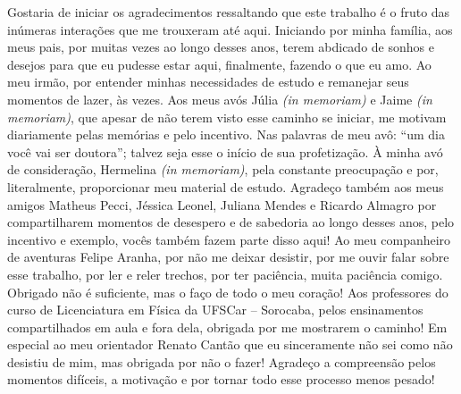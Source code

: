 

\begin{agradecimentos}
  Gostaria de iniciar os agradecimentos ressaltando que este trabalho é o fruto das inúmeras interações que me trouxeram até aqui. Iniciando por minha família, aos meus pais, por muitas vezes ao longo desses anos, terem abdicado de sonhos e desejos para que eu pudesse estar aqui, finalmente, fazendo o que eu amo. Ao meu irmão, por entender minhas necessidades de estudo e remanejar seus momentos de lazer, às vezes. Aos meus avós Júlia \textit{(in memoriam)} e Jaime \textit{(in memoriam)}, que apesar de não terem visto esse caminho se iniciar, me motivam diariamente pelas memórias e pelo incentivo. Nas palavras de meu avô: ``um dia você vai ser doutora''; talvez seja esse o início de sua profetização. À minha avó de consideração, Hermelina \textit{(in memoriam)}, pela constante preocupação e por, literalmente, proporcionar meu material de estudo.
  Agradeço também aos meus amigos Matheus Pecci, Jéssica Leonel, Juliana Mendes e Ricardo Almagro por compartilharem momentos de desespero e de sabedoria ao longo desses anos, pelo incentivo e exemplo, vocês também fazem parte disso aqui!
  Ao meu companheiro de aventuras Felipe Aranha, por não me deixar desistir, por me ouvir falar sobre esse trabalho, por ler e reler trechos, por ter paciência, muita paciência comigo. Obrigado não é suficiente, mas o faço de todo o meu coração!
  Aos professores do curso de Licenciatura em Física da UFSCar -- Sorocaba, pelos ensinamentos compartilhados em aula e fora dela, obrigada por me mostrarem o caminho! Em especial ao meu orientador Renato Cantão que eu sinceramente não sei como não desistiu de mim, mas obrigada por não o fazer! Agradeço a compreensão pelos momentos difíceis, a motivação e por tornar todo esse processo menos pesado!
\end{agradecimentos}

\cleardoublepage

